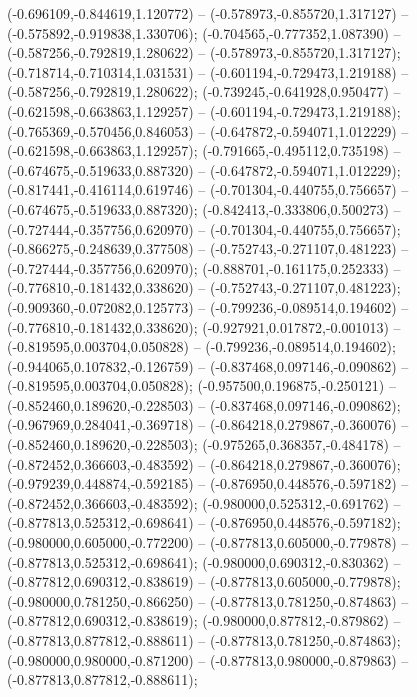  (-0.696109,-0.844619,1.120772) -- (-0.578973,-0.855720,1.317127) -- (-0.575892,-0.919838,1.330706);
 (-0.704565,-0.777352,1.087390) -- (-0.587256,-0.792819,1.280622) -- (-0.578973,-0.855720,1.317127);
 (-0.718714,-0.710314,1.031531) -- (-0.601194,-0.729473,1.219188) -- (-0.587256,-0.792819,1.280622);
 (-0.739245,-0.641928,0.950477) -- (-0.621598,-0.663863,1.129257) -- (-0.601194,-0.729473,1.219188);
 (-0.765369,-0.570456,0.846053) -- (-0.647872,-0.594071,1.012229) -- (-0.621598,-0.663863,1.129257);
 (-0.791665,-0.495112,0.735198) -- (-0.674675,-0.519633,0.887320) -- (-0.647872,-0.594071,1.012229);
 (-0.817441,-0.416114,0.619746) -- (-0.701304,-0.440755,0.756657) -- (-0.674675,-0.519633,0.887320);
 (-0.842413,-0.333806,0.500273) -- (-0.727444,-0.357756,0.620970) -- (-0.701304,-0.440755,0.756657);
 (-0.866275,-0.248639,0.377508) -- (-0.752743,-0.271107,0.481223) -- (-0.727444,-0.357756,0.620970);
 (-0.888701,-0.161175,0.252333) -- (-0.776810,-0.181432,0.338620) -- (-0.752743,-0.271107,0.481223);
 (-0.909360,-0.072082,0.125773) -- (-0.799236,-0.089514,0.194602) -- (-0.776810,-0.181432,0.338620);
 (-0.927921,0.017872,-0.001013) -- (-0.819595,0.003704,0.050828) -- (-0.799236,-0.089514,0.194602);
 (-0.944065,0.107832,-0.126759) -- (-0.837468,0.097146,-0.090862) -- (-0.819595,0.003704,0.050828);
 (-0.957500,0.196875,-0.250121) -- (-0.852460,0.189620,-0.228503) -- (-0.837468,0.097146,-0.090862);
 (-0.967969,0.284041,-0.369718) -- (-0.864218,0.279867,-0.360076) -- (-0.852460,0.189620,-0.228503);
 (-0.975265,0.368357,-0.484178) -- (-0.872452,0.366603,-0.483592) -- (-0.864218,0.279867,-0.360076);
 (-0.979239,0.448874,-0.592185) -- (-0.876950,0.448576,-0.597182) -- (-0.872452,0.366603,-0.483592);
 (-0.980000,0.525312,-0.691762) -- (-0.877813,0.525312,-0.698641) -- (-0.876950,0.448576,-0.597182);
 (-0.980000,0.605000,-0.772200) -- (-0.877813,0.605000,-0.779878) -- (-0.877813,0.525312,-0.698641);
 (-0.980000,0.690312,-0.830362) -- (-0.877812,0.690312,-0.838619) -- (-0.877813,0.605000,-0.779878);
 (-0.980000,0.781250,-0.866250) -- (-0.877813,0.781250,-0.874863) -- (-0.877812,0.690312,-0.838619);
 (-0.980000,0.877812,-0.879862) -- (-0.877813,0.877812,-0.888611) -- (-0.877813,0.781250,-0.874863);
 (-0.980000,0.980000,-0.871200) -- (-0.877813,0.980000,-0.879863) -- (-0.877813,0.877812,-0.888611);
